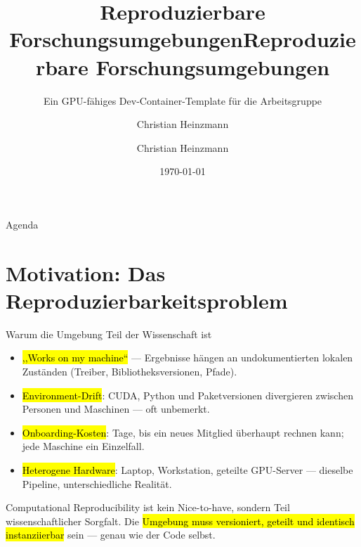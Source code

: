 \documentclass[aspectratio=169,11pt]{beamer}
\title{Reproduzierbare Forschungsumgebungen}
\subtitle{Ein GPU-fähiges Dev-Container-Template für die Arbeitsgruppe}
\author{Christian Heinzmann}
\institute{Hochschule Heilbronn \textperiodcentered\ Promotionskolleg}
\date{\today}
\title[DevContainer-Template]{Reproduzierbare Forschungsumgebungen}
\author[C. Heinzmann]{Christian Heinzmann}
\begin{document}
\hhntitleframe

\begin{frame}{Agenda}
  \tableofcontents
\end{frame}

\section{Motivation: Das Reproduzierbarkeitsproblem}
\begin{frame}{Warum die Umgebung Teil der Wissenschaft ist}
  \begin{itemize}
    \item \hl{,,Works on my machine``} --- Ergebnisse hängen an undokumentierten
          lokalen Zuständen (Treiber, Bibliotheksversionen, Pfade).
    \item \hl{Environment-Drift}: CUDA, Python und Paketversionen divergieren
          zwischen Personen und Maschinen --- oft unbemerkt.
    \item \hl{Onboarding-Kosten}: Tage, bis ein neues Mitglied überhaupt
          rechnen kann; jede Maschine ein Einzelfall.
    \item \hl{Heterogene Hardware}: Laptop, Workstation, geteilte GPU-Server ---
          dieselbe Pipeline, unterschiedliche Realität.
  \end{itemize}
  \vfill
  \begin{takeaway}
    Computational Reproducibility ist kein Nice-to-have, sondern Teil
    wissenschaftlicher Sorgfalt. Die \hl{Umgebung muss versioniert, geteilt und
    identisch instanziierbar} sein --- genau wie der Code selbst.
  \end{takeaway}
\end{frame}

\end{document}
